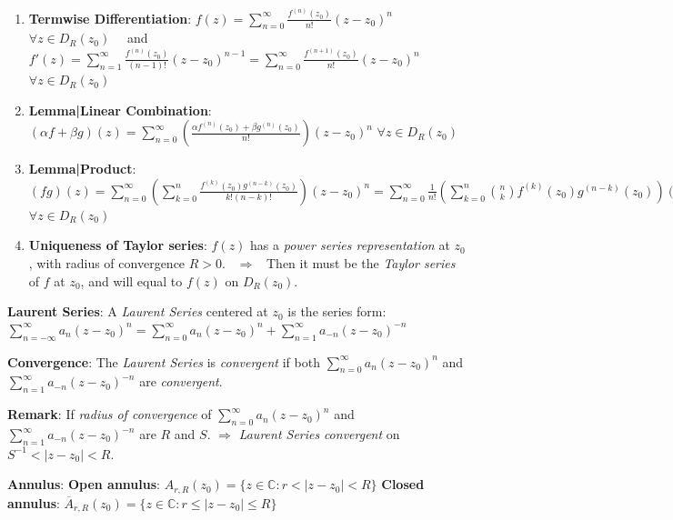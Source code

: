 \documentclass[9pt]{article}
\begin{document}
\begin{enumerate}[itemsep=-2pt, topsep=-2pt]
    \item \textbf{Termwise Differentiation}: {\small $f(z)=\sum\limits^\infty_{n=0}\frac{f^{(n)}(z_0)}{n!}(z-z_0)^n$ {\tiny $\forall z\in D_{R}(z_0)$} \ \ and \ \ $f'(z)=\sum\limits^\infty_{n=1}\frac{f^{(n)}(z_0)}{(n-1)!}(z-z_0)^{n-1}= \sum\limits^\infty_{n=0}\frac{f^{(n+1)}(z_0)}{n!}(z-z_0)^n$ {\tiny $\forall z\in D_{R}(z_0)$}}
    \vspace{-5pt}
    \item \textbf{Lemma|Linear Combination}: $(\alpha f+\beta g)(z)=\sum\limits^\infty_{n=0}\left(\frac{\alpha f^{(n)}(z_0)+\beta g^{(n)}(z_0)}{n!}\right)(z-z_0)^n$ {\tiny $\forall z\in D_{R}(z_0)$}
    \vspace{-5pt}
    \item \textbf{Lemma|Product}: $(fg)(z)=\sum\limits^\infty_{n=0}\left(\sum\limits^n_{k=0}\frac{f^{(k)}(z_0)g^{(n-k)}(z_0)}{k!(n-k)!}\right)(z-z_0)^n=\sum\limits^\infty_{n=0}\frac{1}{n!}\left(\sum\limits^n_{k=0}\binom{n}{k}f^{(k)}(z_0)g^{(n-k)}(z_0)\right)(z-z_0)^n$ {\tiny $\forall z\in D_{R}(z_0)$}
    \vspace{-1pt}
    \item \textbf{Uniqueness of Taylor series}: {\footnotesize $f(z)$ has a \textit{power series representation} at $z_0$, with radius of convergence $R>0$. \ $\Rightarrow$ \ Then it must be the \textit{Taylor series} of $f$ at $z_0$, and will equal to $f(z)$ on $D_{R}(z_0)$.} 
\end{enumerate}

\textbf{Laurent Series}: A \textit{Laurent Series} centered at $z_0$ is the series form: $\sum^\infty_{n=-\infty}a_n(z-z_0)^n=\sum^\infty_{n=0}a_n(z-z_0)^n+\sum^\infty_{n=1}a_{-n}(z-z_0)^{-n}$

\qquad \textbf{Convergence}: The \textit{Laurent Series} is \textit{convergent} if both $\sum^\infty_{n=0}a_n(z-z_0)^n$ and $\sum^\infty_{n=1}a_{-n}(z-z_0)^{-n}$ are \textit{convergent}.

\qquad \textbf{Remark}: {\small If \textit{radius of convergence} of $\sum^\infty_{n=0}a_n(z-z_0)^n$ and $\sum^\infty_{n=1}a_{-n}(z-z_0)^{-n}$ are $R$ and $S$. $\Rightarrow$ \textit{Laurent Series} \textit{convergent} on $S^{-1}<|z-z_0|<R$.}

\textbf{Annulus}: \textbf{Open annulus}: $A_{r,R}(z_0)=\{z\in\mathbb{C}:r<|z-z_0|<R\}$ \quad \textbf{Closed annulus}: $\overline{A}_{r,R}(z_0)=\{z\in\mathbb{C}:r\leq|z-z_0|\leq R\}$
\end{document}
